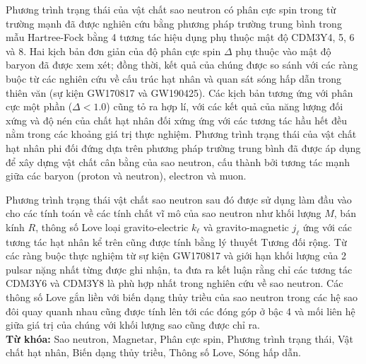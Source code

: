 Phương trình trạng thái của vật chất sao neutron có phân cực spin trong từ trường mạnh đã
được nghiên cứu bằng phương pháp trường trung bình trong mẫu Hartree-Fock bằng 4 tương tác
hiệu dụng phụ thuộc mật độ CDM3Y4, 5, 6 và 8. Hai kịch bản đơn giản của độ phân cực spin
$\Delta$ phụ thuộc vào mật độ baryon đã được xem xét; đồng thời, kết quả của chúng được so
sánh với các ràng buộc từ các nghiên cứu về cấu trúc hạt nhân và quan sát sóng hấp dẫn
trong thiên văn (sự kiện GW170817 và GW190425). Các kịch bản tương ứng với phân cực một
phần ($\Delta < 1.0$) cũng tỏ ra hợp lí, với các kết quả của năng lượng đối xứng và độ nén
của chất hạt nhân đối xứng ứng với các tương tác hầu hết đều nằm trong các khoảng giá trị
thực nghiệm. Phương trình trạng thái của vật chất hạt nhân phi đối đứng dựa trên phương
pháp trường trung bình đã được áp dụng để xây dựng vật chất cân bằng \textbeta của sao
neutron, cấu thành bởi tương tác mạnh giữa các baryon (proton và neutron), electron và muon.

Phương trình trạng thái vật chất sao neutron sau đó được sử dụng làm đầu vào cho các tính
toán về các tính chất vĩ mô của sao neutron như khối lượng $M$, bán kính $R$, thông số
Love loại gravito-electric $k_\ell$ và gravito-magnetic $j_\ell$ ứng với các tương tác hạt nhân
kể trên cũng được tính bằng lý thuyết Tương đối rộng. Từ các ràng buộc thực nghiệm từ sự kiện GW170817 và giới hạn khối lượng của 2 pulsar nặng nhất từng được ghi nhận, ta đưa ra kết luận rằng chỉ các tương tác CDM3Y6 và CDM3Y8 là phù hợp nhất trong nghiên cứu về sao neutron. Các thông số Love gắn liền với biến dạng thủy triều của sao neutron trong các hệ sao đôi quay quanh nhau cũng được tính lên tới các đóng góp ở bậc 4 và mối liên hệ giữa giá trị của chúng với khối lượng sao cũng được chỉ ra.\\[5mm]
\textbf{Từ khóa:} Sao neutron, Magnetar, Phân cực spin, Phương trình trạng thái, Vật chất hạt nhân, Biến dạng thủy triều, Thông số Love, Sóng hấp dẫn.
